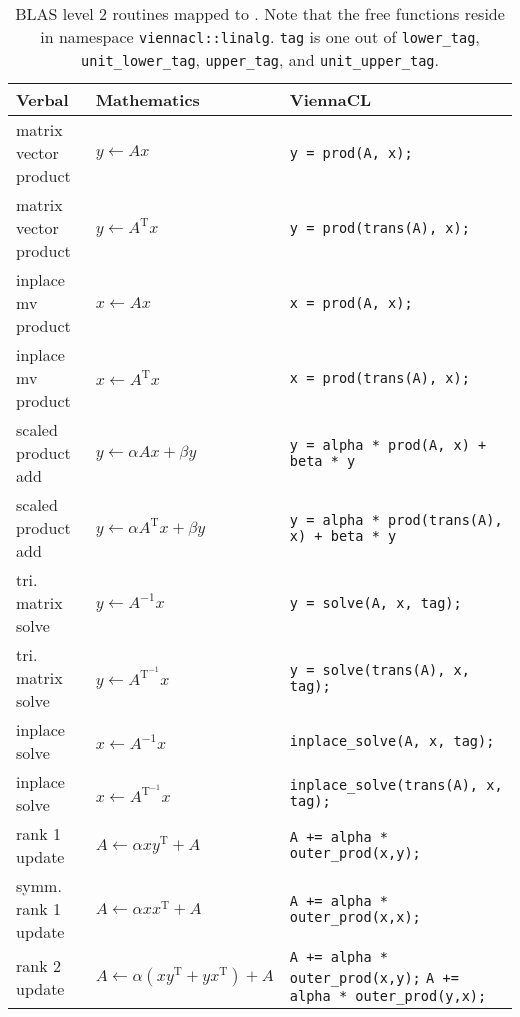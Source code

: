 

\begin{table}[tb]
\begin{center}
\renewcommand{\arraystretch}{1.2}
\begin{tabular}{p{4cm}|l|p{7cm}}
Verbal & Mathematics & ViennaCL\\
\hline
matrix vector product & $y \leftarrow A x$ & \lstinline|y = prod(A, x);| \\
matrix vector product & $y \leftarrow A^\mathrm{T} x$ & \lstinline|y = prod(trans(A), x);| \\
inplace mv product & $x \leftarrow A x$ & \lstinline|x = prod(A, x);| \\
inplace mv product & $x \leftarrow A^\mathrm{T} x$ & \lstinline|x = prod(trans(A), x);| \\
\hline
scaled product add & $y \leftarrow \alpha A x + \beta y$ & \lstinline|y = alpha * prod(A, x) + beta * y| \\
scaled product add & $y \leftarrow \alpha A^{\mathrm T} x + \beta y$ & \lstinline|y = alpha * prod(trans(A), x) + beta * y| \\
\hline
tri. matrix solve & $y \leftarrow A^{-1} x$ & \lstinline|y = solve(A, x, tag);| \\
tri. matrix solve & $y \leftarrow A^\mathrm{T^{-1}} x$ & \lstinline|y = solve(trans(A), x, tag);| \\
inplace solve & $x \leftarrow A^{-1} x$ & \lstinline|inplace_solve(A, x, tag);| \\
inplace solve & $x \leftarrow A^\mathrm{T^{-1}} x$ & \lstinline|inplace_solve(trans(A), x, tag);| \\
\hline
rank 1 update & $A \leftarrow \alpha x y^{\mathrm T} + A$ & \lstinline|A += alpha * outer_prod(x,y);| \\
symm. rank 1 update & $A \leftarrow \alpha x x^{\mathrm T} + A$ & \lstinline|A += alpha * outer_prod(x,x);| \\
rank 2 update & $A \leftarrow \alpha (x y^{\mathrm T} + y x^{\mathrm T}) + A$ & \lstinline|A += alpha * outer_prod(x,y);| \lstinline|A += alpha * outer_prod(y,x);| \\
\end{tabular}
\caption{BLAS level 2 routines mapped to \ViennaCL. Note that the free functions reside in namespace \texttt{viennacl::linalg}. \lstinline|tag| is one out of \lstinline|lower_tag|, \lstinline|unit_lower_tag|, \lstinline|upper_tag|, and \lstinline|unit_upper_tag|.}
\label{tab:blas-level-2}
\end{center}
\end{table}


